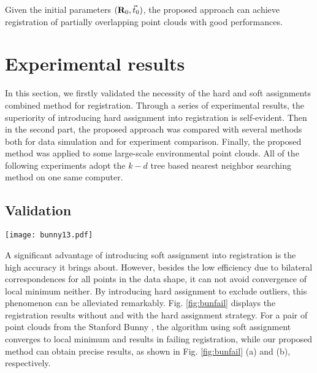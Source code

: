 \documentclass[review]{elsarticle}
\begin{document}
Given the initial parameters $({{\bf{R}}_0},{\vec t _0})$, the proposed approach can achieve registration of partially overlapping point clouds with good performances.



\section{Experimental results}
In this section, we firstly validated the necessity of the hard and soft assignments combined method for registration. Through a series of experimental results, the superiority of introducing hard assignment into registration is self-evident. Then in the second part, the proposed approach was compared with several methods both for data simulation and for experiment comparison. Finally, the proposed method was applied to some large-scale environmental point clouds. All of the following experiments adopt the $k-d$ tree based nearest neighbor searching method on one same computer.

\subsection{Validation}

\begin{figure*}[htbp]
  \centering
  \centerline{\texttt{[image: bunny13.pdf]}}

\caption{Registration comparison for a pair of point clouds. (a) Result using BdICP. (b) Result using the proposed approach.}\medskip

\label{fig:bunfail}
\end{figure*}


A significant advantage of introducing soft assignment into registration is the high accuracy it brings about. However, besides the low efficiency due to bilateral correspondences for all points in the data shape, it can not avoid convergence of local minimum neither. By introducing hard assignment to exclude outliers, this phenomenon can be alleviated remarkably. Fig. \ref{fig:bunfail} displays the registration results without and with the hard assignment strategy. For a pair of point clouds from the Stanford Bunny \cite{StanfordRep}, the algorithm using soft assignment converges to local minimum and results in failing registration, while our proposed method can obtain precise results, as shown in Fig. \ref{fig:bunfail} (a) and (b), respectively.
\end{document}
